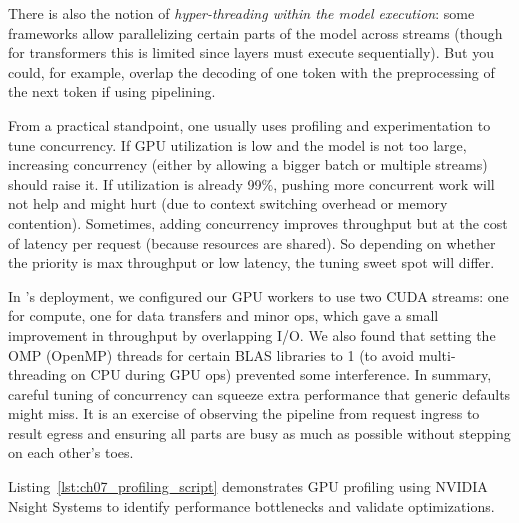 There is also the notion of \textit{hyper-threading within the model execution}: some frameworks allow parallelizing certain parts of the model across streams (though for transformers this is limited since layers must execute sequentially). But you could, for example, overlap the decoding of one token with the preprocessing of the next token if using pipelining.

From a practical standpoint, one usually uses profiling and experimentation to tune concurrency. If GPU utilization is low and the model is not too large, increasing concurrency (either by allowing a bigger batch or multiple streams) should raise it. If utilization is already 99\%, pushing more concurrent work will not help and might hurt (due to context switching overhead or memory contention). Sometimes, adding concurrency improves throughput but at the cost of latency per request (because resources are shared). So depending on whether the priority is max throughput or low latency, the tuning sweet spot will differ.

In \ishtar{}'s deployment, we configured our GPU workers to use two CUDA streams: one for compute, one for data transfers and minor ops, which gave a small improvement in throughput by overlapping I/O. We also found that setting the OMP (OpenMP) threads for certain BLAS libraries to 1 (to avoid multi-threading on CPU during GPU ops) prevented some interference. In summary, careful tuning of concurrency can squeeze extra performance that generic defaults might miss. It is an exercise of observing the pipeline from request ingress to result egress and ensuring all parts are busy as much as possible without stepping on each other's toes.

Listing~\ref{lst:ch07_profiling_script} demonstrates GPU profiling using NVIDIA Nsight Systems to identify performance bottlenecks and validate optimizations.

